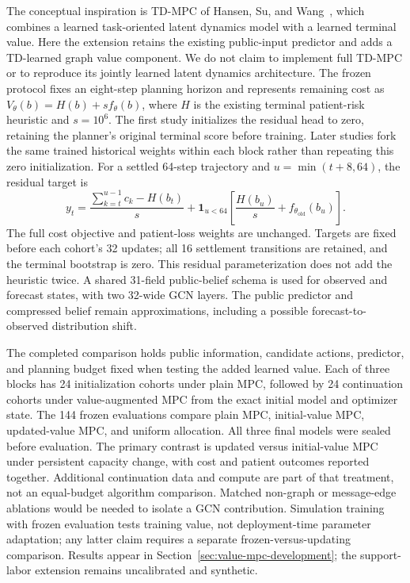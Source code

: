 \documentclass[preprint,review,12pt]{elsarticle}
\begin{document}
The conceptual inspiration is TD-MPC of Hansen, Su, and Wang~\cite{Hansen2022TDMPC},
which combines a learned task-oriented latent dynamics model with a learned
terminal value. Here the extension retains the existing
public-input predictor and adds a TD-learned graph value component. We do not
claim to implement full TD-MPC or to reproduce its jointly learned latent
dynamics architecture. The frozen protocol fixes an eight-step planning horizon
and represents remaining cost as $V_\theta(b)=H(b)+s f_\theta(b)$, where $H$ is
the existing terminal patient-risk heuristic and $s=10^6$. The first study
initializes the residual head to zero, retaining the planner's original
terminal score before training. Later studies fork the same trained historical
weights within each block rather than repeating this zero initialization.
For a settled 64-step trajectory and $u=\min(t+8,64)$, the
residual target is
\[
 y_t = \frac{\sum_{k=t}^{u-1}c_k-H(b_t)}{s}
       +\mathbf{1}_{u<64}\left[\frac{H(b_u)}{s}+f_{\theta_{\mathrm{old}}}(b_u)\right].
\]
The full cost objective and patient-loss weights are unchanged. Targets are
fixed before each cohort's 32 updates; all 16 settlement transitions are
retained, and the terminal bootstrap is zero. This residual parameterization
does not add the heuristic twice. A shared 31-field public-belief schema is
used for observed and forecast states, with two 32-wide GCN layers. The public
predictor and compressed belief remain approximations, including a possible
forecast-to-observed distribution shift.

The completed comparison holds public information, candidate actions,
predictor, and planning budget fixed when testing the added learned value.
Each of three blocks has 24 initialization cohorts under plain MPC, followed
by 24 continuation cohorts under value-augmented MPC from the exact initial
model and optimizer state. The 144 frozen evaluations compare plain MPC,
initial-value MPC, updated-value MPC, and uniform allocation. All three final
models were sealed before evaluation. The primary contrast is updated
versus initial-value MPC under persistent capacity change, with cost and
patient outcomes reported together. Additional continuation data and compute
are part of that treatment, not an equal-budget algorithm comparison.
Matched non-graph or message-edge ablations would be needed to isolate a GCN
contribution. Simulation training with frozen evaluation tests training
value, not deployment-time parameter adaptation; any latter claim requires a
separate frozen-versus-updating comparison. Results appear in
Section~\ref{sec:value-mpc-development}; the support-labor extension remains
uncalibrated and synthetic.
\end{document}
